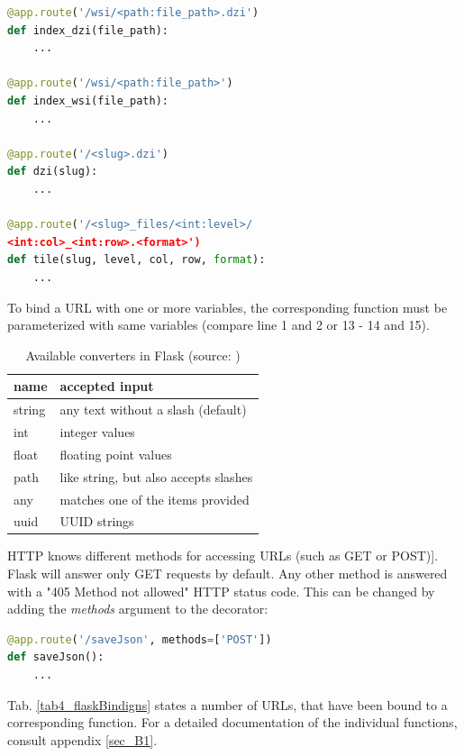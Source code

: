 \begin{lstlisting}[language=Python, frame=single]
@app.route('/wsi/<path:file_path>.dzi')
def index_dzi(file_path):
	...

@app.route('/wsi/<path:file_path>')
def index_wsi(file_path):
	...

@app.route('/<slug>.dzi')
def dzi(slug):
	...

@app.route('/<slug>_files/<int:level>/
<int:col>_<int:row>.<format>')
def tile(slug, level, col, row, format):
	...
\end{lstlisting}

To bind a URL with one or more variables, the corresponding function must be parameterized with same variables (compare line 1 and 2 or 13 - 14 and 15)\cite{web:flask}.

\begin{table}[H]
	\begin{center}
		\begin{tabular}{| l | l |}
			\hline
			\textbf{name} & \textbf{accepted input}\\ \hline
			string & any text without a slash (default)\\ \hline
			int & integer values\\ \hline
			float & floating point values\\ \hline
			path & like string, but also accepts slashes \\ \hline
			any & matches one of the items provided\\ \hline
			uuid & UUID strings\\ \hline
		\end{tabular}
		\caption{Available converters in Flask (source: \cite{web:flask})}
		\label{tab4_converter}
	\end{center}
\end{table}

HTTP knows different methods for accessing URLs (such as GET or POST)\cite{web:w3c}]. Flask will answer only GET requests by default. Any other method is answered with a "405 Method not allowed" HTTP status code\cite{web:flask}. This can be changed by adding the \emph{methods} argument to the decorator:

\begin{lstlisting}[language=Python, frame=single]
@app.route('/saveJson', methods=['POST'])
def saveJson():
	...
\end{lstlisting}

Tab. \ref{tab4_flaskBindigns} states a number of URLs, that have been bound to a corresponding function. For a detailed documentation of the individual functions, consult appendix \ref{sec_B1}.

